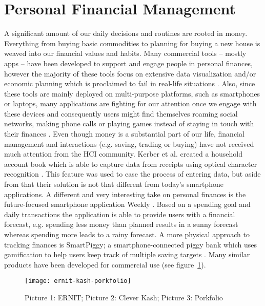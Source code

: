 \section{Personal Financial Management}
A significant amount of our daily decisions and routines are rooted in money. Everything from buying basic commodities to planning for buying a new house is weaved into our financial values and habits. Many commercial tools -- mostly apps \cite{mint,spiir,levelmoney,homebudget,moneylover} -- have been developed to support and engage people in personal finances, however the majority of these tools focus on extensive data visualization and/or economic planning which is proclaimed to fail in real-life situations \cite{snow2015fixing}. Also, since these tools are mainly deployed on multi-purpose platforms, such as smartphones or laptops, many applications are fighting for our attention once we engage with these devices and consequently users might find themselves roaming social networks, making phone calls or playing games instead of staying in touch with their finances \cite[p.~3894]{coleman2008nestegg}. Even though money is a substantial part of our life, financial management and interactions (e.g. saving, trading or buying) have not received much attention from the HCI community.
Kerber et al. created a household account book which is able to capture data from receipts using optical character recognition \cite{kerber2014towards}. This feature was used to ease the process of entering data, but aside from that their solution is not that different from today’s smartphone applications. A different and very interesting take on personal finances is the future-focused smartphone application Weekly \cite{weekly}. Based on a spending goal and daily transactions the application is able to provide users with a financial forecast, e.g. spending less money than planned results in a sunny forecast whereas spending more leads to a rainy forecast. A more physical approach to tracking finances is SmartPiggy; a smartphone-connected piggy bank which uses gamification to help users keep track of multiple saving targets \cite{stockinger2013smartpiggy}. Many similar products have been developed for commercial use \cite{ernit,kash,porkfolio} (see figure~\ref{fig:ernit-kash-porkfolio}).

\begin{figure}[h]
	\centering
	\texttt{[image: ernit-kash-porkfolio]}
	\caption{Picture 1: ERNIT; Picture 2: Clever Kash; Picture 3: Porkfolio}
	\label{fig:ernit-kash-porkfolio}
\end{figure}

